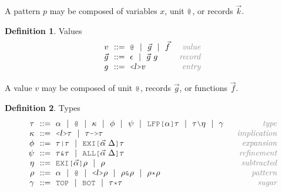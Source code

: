 \documentclass[acmsmall]{acmart}
\theoremstyle{definition}
\newtheorem{definition}{Definition}[section]
\begin{document}
\noindent
A pattern $p$ may be composed of variables $x$, unit $\J{@}$, or records $\vec{k}$. 

\begin{definition} Values 
  \label{def:values}
  \[\begin{array}[t]{r@{}l@{}r}
    \nonterm{v} & \is 
      \J{@} \sep
      \vec{g} \sep
      \vec{f}
    & \com{value}
    \\
    \nonterm{\vec{g}} & \is \epsilon \sep \vec{g}\ g
    & \com{record}
    \\
    \nonterm{g} & \is \J{<}l\J{>}v
    & \com{entry}
  \end{array}\]
\end{definition}

\noindent
A value $v$ may be composed of unit $\J{@}$, records $\vec{g}$, or functions $\vec{f}$. 

\begin{definition} Types 
  \label{def:types}
  \[\begin{array}[t]{r@{}l@{}r}
    \nonterm{\tau} & \is 
    \begin{array}[t]{@{}l}
      \alpha \sep
      \J{@} \sep
      \kappa \sep 
      \phi \sep 
      \psi \sep 
      \J{LFP[}\alpha\J{]}\tau \sep
      \tau \typdiff \eta \sep
      \gamma
    \end{array}
    & \com{type}
    \\
    \nonterm{\kappa} & \is 
    \begin{array}[t]{@{}l}
      \J{<} l \J{>} \tau \sep 
      \tau\J{->}\tau
    \end{array}
    & \com{implication}
    \\
    \nonterm{\phi} & \is 
    \begin{array}[t]{@{}l}
      \tau\J{|}\tau \sep 
      \J{EXI[}\vec{\alpha}\ \Delta \J{]} \tau
    \end{array}
    & \com{expansion}
    \\
    \nonterm{\psi} & \is 
    \begin{array}[t]{@{}l}
      \tau\J{\&}\tau \sep 
      \J{ALL[}\vec{\alpha}\ \Delta \J{]} \tau
    \end{array}
    & \com{refinement}
    \\
    \nonterm{\eta} & \is 
    \begin{array}[t]{@{}l}
      \J{EXI[}\vec{\alpha} \J{]} \rho \sep 
      \rho
    \end{array}
    & \com{subtracted}
    \\
    \nonterm{\rho} & \is 
    \begin{array}[t]{@{}l}
      \alpha \sep
      \J{@} \sep
      \J{<}l\J{>}\rho \sep 
      \rho\J{\&}\rho \sep
      \rho\J{*}\rho
    \end{array}
    & \com{pattern}
    \\
    \nonterm{\gamma} & \is 
    \begin{array}[t]{@{}l}
      \J{TOP} \sep \J{BOT} \sep 
      \tau \J{*} \tau 
    \end{array}
    & \com{sugar}
  \end{array}\]
\end{definition}
\end{document}
